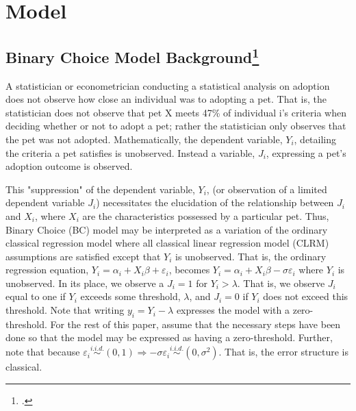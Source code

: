 \documentclass[12pt]{article}
\newcommand{\RA}{\Rightarrow}
\begin{document}
		\section{Model}
		
		\subsection{Binary Choice Model Background\footcite{BCM}}
		A statistician or econometrician conducting a statistical analysis on adoption does not observe how close an individual was to adopting a pet. That is, the statistician does not observe that pet X meets 47\% of individual i's criteria when deciding whether or not to adopt a pet; rather the statistician only observes that the pet was not adopted. Mathematically, the dependent variable, $ Y_i $, detailing the criteria a pet satisfies is unobserved. Instead a variable, $ J_i $, expressing a pet's adoption outcome is observed. 
		
		This "suppression" of the dependent variable, $ Y_i $, (or observation of a limited dependent variable $ J_i $) necessitates the elucidation of the relationship between $ J_i $ and $ X_i $, where $ X_i $ are the characteristics possessed by a particular pet. Thus, Binary Choice (BC) model may be interpreted as a variation of the ordinary classical regression model where all classical linear regression model (CLRM) assumptions are satisfied except that $ Y_i $ is unobserved. That is, the ordinary regression equation, $ Y_i=\alpha_i + X_i \beta +\varepsilon_i $, becomes $ Y_i=\alpha_i + X_i \beta - \sigma \varepsilon_i $ where $ Y_i $ is unobserved. In its place, we observe a $ J_i=1 $ for $ Y_i>\lambda $. That is, we observe $ J_i $ equal to one if $ Y_i $ exceeds some threshold, $ \lambda $, and $ J_i=0 $ if $ Y_i $ does not exceed this threshold. Note that writing $ y_i=Y_i-\lambda $ expresses the model with a zero-threshold. For the rest of this paper, assume that the necessary steps have been done so that the model may be expressed as having a zero-threshold. Further, note that because $ \varepsilon_i \overset{i.i.d.}{\sim}(0,1)\RA -\sigma\varepsilon_i \overset{i.i.d.}{\sim}(0,\sigma^2) $. That is, the error structure is classical.
		
\end{document}
